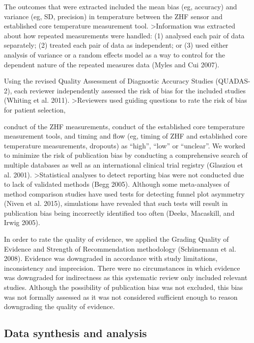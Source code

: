 \documentclass[smallextended]{svjour3}       %
\begin{document}
The outcomes that were extracted included the mean bias (eg, accuracy)
and variance (eg, SD, precision) in temperature between the ZHF sensor
and established core temperature measurement tool.
\textgreater{}Information was extracted about how repeated measurements
were handled: (1) analysed each pair of data separately; (2) treated
each pair of data as independent; or (3) used either analysis of
variance or a random effects model as a way to control for the dependent
nature of the repeated measures data (Myles and Cui 2007).

Using the revised Quality Assessment of Diagnostic Accuracy Studies
(QUADAS-2), each reviewer independently assessed the risk of bias for
the included studies (Whiting et al. 2011). \textgreater{}Reviewers used
guiding questions to rate the risk of bias for patient selection,

conduct of the ZHF measurements, conduct of the established core
temperature measurement tools, and timing and flow (eg, timing of ZHF
and established core temperature measurements, dropouts) as ``high'',
``low'' or ``unclear''. We worked to minimize the risk of publication
bias by conducting a comprehensive search of multiple databases as well
as an international clinical trial registry (Glasziou et al. 2001).
\textgreater{}Statistical analyses to detect reporting bias were not
conducted due to lack of validated methods (Begg 2005). Although some
meta-analyses of method comparison studies have used tests for detecting
funnel plot asymmetry (Niven et al. 2015), simulations have revealed
that such tests will result in publication bias being incorrectly
identified too often (Deeks, Macaskill, and Irwig 2005).

In order to rate the quality of evidence, we applied the Grading Quality
of Evidence and Strength of Recommendation methodology (Schünemann et
al. 2008). Evidence was downgraded in accordance with study limitations,
inconsistency and imprecision. There were no circumstances in which
evidence was downgraded for indirectness as this systematic review only
included relevant studies. Although the possibility of publication bias
was not excluded, this bias was not formally assessed as it was not
considered sufficient enough to reason downgrading the quality of
evidence.

\hypertarget{data-synthesis-and-analysis}{%
\subsection{Data synthesis and
analysis}\label{data-synthesis-and-analysis}}
\end{document}
